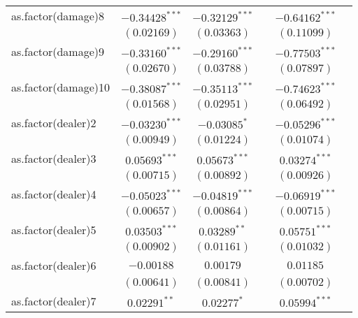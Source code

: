 \begin{table}
\begin{center}
\begin{tabular}{l c c c c c}
as.factor(damage)8  & $-0.34428^{***}$ & $-0.32129^{***}$ &                  & $-0.64162^{***}$ &                  \\
                    & $(0.02169)$      & $(0.03363)$      &                  & $(0.11099)$      &                  \\
as.factor(damage)9  & $-0.33160^{***}$ & $-0.29160^{***}$ &                  & $-0.77503^{***}$ &                  \\
                    & $(0.02670)$      & $(0.03788)$      &                  & $(0.07897)$      &                  \\
as.factor(damage)10 & $-0.38087^{***}$ & $-0.35113^{***}$ &                  & $-0.74623^{***}$ &                  \\
                    & $(0.01568)$      & $(0.02951)$      &                  & $(0.06492)$      &                  \\
as.factor(dealer)2  & $-0.03230^{***}$ & $-0.03085^{*}$   &                  & $-0.05296^{***}$ &                  \\
                    & $(0.00949)$      & $(0.01224)$      &                  & $(0.01074)$      &                  \\
as.factor(dealer)3  & $0.05693^{***}$  & $0.05673^{***}$  &                  & $0.03274^{***}$  &                  \\
                    & $(0.00715)$      & $(0.00892)$      &                  & $(0.00926)$      &                  \\
as.factor(dealer)4  & $-0.05023^{***}$ & $-0.04819^{***}$ &                  & $-0.06919^{***}$ &                  \\
                    & $(0.00657)$      & $(0.00864)$      &                  & $(0.00715)$      &                  \\
as.factor(dealer)5  & $0.03503^{***}$  & $0.03289^{**}$   &                  & $0.05751^{***}$  &                  \\
                    & $(0.00902)$      & $(0.01161)$      &                  & $(0.01032)$      &                  \\
as.factor(dealer)6  & $-0.00188$       & $0.00179$        &                  & $0.01185$        &                  \\
                    & $(0.00641)$      & $(0.00841)$      &                  & $(0.00702)$      &                  \\
as.factor(dealer)7  & $0.02291^{**}$   & $0.02277^{*}$    &                  & $0.05994^{***}$  &                  \\

\end{tabular}
\end{center}
\end{table}
